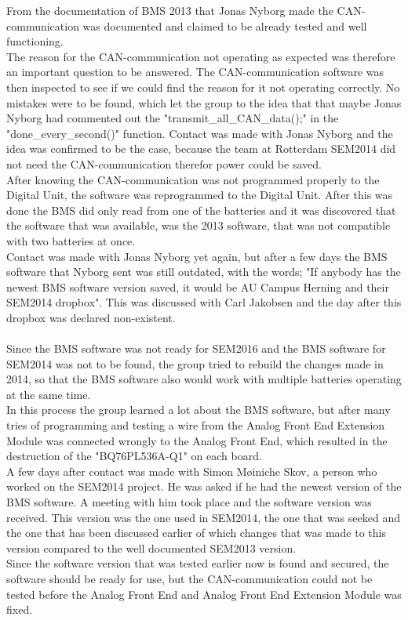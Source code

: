 From the documentation of BMS 2013  that Jonas Nyborg made the CAN-communication was documented and claimed to be already tested and well functioning.\\
The reason for the CAN-communication not operating as expected was therefore an important question to be answered. The CAN-communication software was then inspected to see if we could find the reason for it not operating correctly. No mistakes were to be found, which let the group to the idea that that maybe Jonas Nyborg had commented out the "transmit\_all\_CAN\_data();" in the "done\_every\_second()" function. Contact was made with Jonas Nyborg and the idea was confirmed to be the case, because the team at Rotterdam SEM2014 did not need the CAN-communication therefor power could be saved.\\
After knowing the CAN-communication was not programmed properly to the Digital Unit, the software was reprogrammed to the Digital Unit. After this was done the BMS did only read from one of the batteries and it was discovered that the software that was available, was the 2013 software, that was not compatible with two batteries at once.\\
Contact was made with Jonas Nyborg yet again, but after a few days the BMS software that Nyborg sent was still outdated, with the words; "If anybody has the newest BMS software version saved, it would be AU Campus Herning and their SEM2014 dropbox". This was discussed with Carl Jakobsen and the day after this dropbox was declared non-existent.\\
\\
Since the BMS software was not ready for SEM2016 and the BMS software for SEM2014 was not to be found, the group tried to rebuild the changes made in 2014, so that the BMS software also would work with multiple batteries operating at the same time.\\ In this process the group learned a lot about the BMS software, but after many tries of programming and testing a wire from the Analog Front End Extension Module was connected wrongly to the Analog Front End, which resulted in the destruction of the "BQ76PL536A-Q1" on each board.\\
A few days after contact was made with Simon Møiniche Skov, a person who worked on the SEM2014 project. He was asked if he had the newest version of the BMS software. A meeting with him took place and the software version was received. This version was the one used in SEM2014, the one that was seeked and the one that has been discussed earlier of which changes that was made to this version compared to the well documented SEM2013 version.\\
Since the software version that was tested earlier now is found and secured, the software should be ready for use, but the CAN-communication could not be tested before the Analog Front End and Analog Front End Extension Module was fixed.\\  